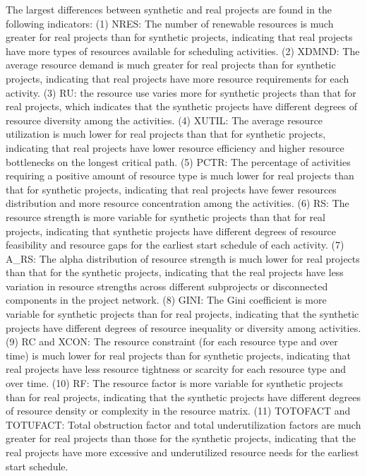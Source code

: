 \documentclass[preprint,
3p]{elsarticle} %
\begin{document}
The largest differences between synthetic and real projects are found in
the following indicators: (1) NRES: The number of renewable resources is
much greater for real projects than for synthetic projects, indicating
that real projects have more types of resources available for scheduling
activities. (2) XDMND: The average resource demand is much greater for
real projects than for synthetic projects, indicating that real projects
have more resource requirements for each activity. (3) RU: the resource
use varies more for synthetic projects than that for real projects,
which indicates that the synthetic projects have different degrees of
resource diversity among the activities. (4) XUTIL: The average resource
utilization is much lower for real projects than that for synthetic
projects, indicating that real projects have lower resource efficiency
and higher resource bottlenecks on the longest critical path. (5) PCTR:
The percentage of activities requiring a positive amount of resource
type is much lower for real projects than that for synthetic projects,
indicating that real projects have fewer resources distribution and more
resource concentration among the activities. (6) RS: The resource
strength is more variable for synthetic projects than that for real
projects, indicating that synthetic projects have different degrees of
resource feasibility and resource gaps for the earliest start schedule
of each activity. (7) A\_RS: The alpha distribution of resource strength
is much lower for real projects than that for the synthetic projects,
indicating that the real projects have less variation in resource
strengths across different subprojects or disconnected components in the
project network. (8) GINI: The Gini coefficient is more variable for
synthetic projects than for real projects, indicating that the synthetic
projects have different degrees of resource inequality or diversity
among activities. (9) RC and XCON: The resource constraint (for each
resource type and over time) is much lower for real projects than for
synthetic projects, indicating that real projects have less resource
tightness or scarcity for each resource type and over time. (10) RF: The
resource factor is more variable for synthetic projects than for real
projects, indicating that the synthetic projects have different degrees
of resource density or complexity in the resource matrix. (11) TOTOFACT
and TOTUFACT: Total obstruction factor and total underutilization
factors are much greater for real projects than those for the synthetic
projects, indicating that the real projects have more excessive and
underutilized resource needs for the earliest start schedule.
\end{document}
